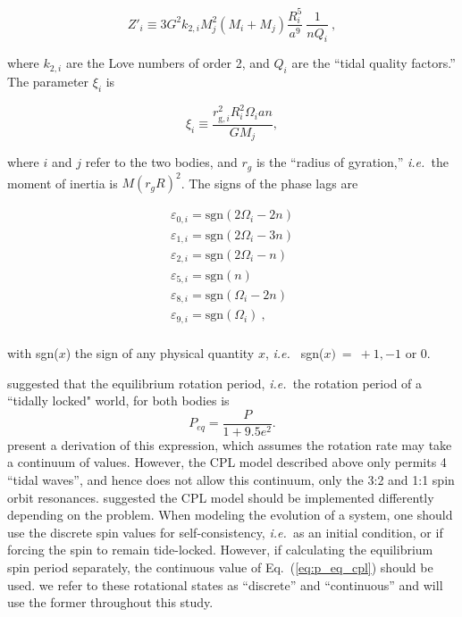 \documentclass[preprint,12pt]{aastex}
\def\ie{{\it i.e.\ }}
\begin{document}
\begin{equation}\label{eq:Zp}
Z'_i \equiv 3 G^2 k_{2,i} M_j^2 (M_i+M_j) \frac{R_i^5}{a^9} \ \frac{1}{n Q_i} \ ,
\end{equation}

\noindent where $k_{2,i}$ are the Love numbers of order 2, and $Q_i$ are the ``tidal quality factors.'' The parameter $\xi_i$ is

\begin{equation}\label{eq:chi}
\xi_i \equiv \frac{r_{\mathrm{g},i}^2 R_i^2 \Omega_i a n }{ G M_j},
\end{equation}

\noindent where $i$ and $j$ refer to the two bodies, and $r_g$ is the ``radius of gyration,'' \ie the moment of inertia is $M(r_gR)^2$. The signs of the phase lags are

\begin{equation}\label{eq:epsilon}
\begin{array}{l}
\varepsilon_{0,i} = \textrm{sgn}(2 \Omega_i - 2 n)\\
\varepsilon_{1,i} = \textrm{sgn}(2 \Omega_i - 3 n)\\
\varepsilon_{2,i} = \textrm{sgn}(2 \Omega_i - n)\\
\varepsilon_{5,i} = \textrm{sgn}(n)\\
\varepsilon_{8,i} = \textrm{sgn}(\Omega_i - 2 n)\\
\varepsilon_{9,i} = \textrm{sgn}(\Omega_i) \ ,\\
\end{array}
\end{equation}

\noindent with sgn($x$) the sign of any physical quantity $x$, \ie
sgn($x)~=~+1, -1$ or 0.

\cite{Goldreich66} suggested that the equilibrium rotation period, \ie the rotation period of a ``tidally locked" world, for both bodies is
\begin{equation}\label{eq:p_eq_cpl}
P_{eq} = \frac{P}{1 + 9.5e^2}.
\end{equation}
\cite{MurrayDermott99} present a derivation of this expression, which
assumes the rotation rate may take a continuum of values. However, the
CPL model described above only permits 4 ``tidal waves'', and hence does
not allow this continuum, only the 3:2 and 1:1 spin orbit resonances. \cite{Barnes13} suggested
the CPL model should be implemented differently depending on the problem. When
modeling the evolution of a system, one should use the discrete spin
values for self-consistency, \ie as an initial condition, or if forcing the spin to remain tide-locked. However, if calculating the equilibrium
spin period separately, the continuous value of Eq.~(\ref{eq:p_eq_cpl})
should be used. we refer to these rotational states as ``discrete'' and
``continuous'' and will use the former throughout this study.
\end{document}
